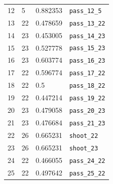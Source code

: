 \documentclass{l4proj}
\begin{document}
\begin{table}[h]
\begin{tabular}{llll}
12 & 5  & 0.882353 & \texttt{pass\_12\_5}  \\
13 & 22 & 0.478659 & \texttt{pass\_13\_22} \\
14 & 23 & 0.453005 & \texttt{pass\_14\_23} \\
15 & 23 & 0.527778 & \texttt{pass\_15\_23} \\
16 & 23 & 0.603774 & \texttt{pass\_16\_23} \\
17 & 22 & 0.596774 & \texttt{pass\_17\_22} \\
18 & 22 & 0.5      & \texttt{pass\_18\_22} \\
19 & 22 & 0.447214 & \texttt{pass\_19\_22} \\
20 & 23 & 0.479058 & \texttt{pass\_20\_23} \\
21 & 23 & 0.476684 & \texttt{pass\_21\_23} \\
22 & 26 & 0.665231 & \texttt{shoot\_22}    \\
23 & 26 & 0.665231 & \texttt{shoot\_23}    \\
24 & 22 & 0.466055 & \texttt{pass\_24\_22} \\
25 & 22 & 0.497642 & \texttt{pass\_25\_22} \\
\end{tabular}
\end{table}
\end{document}
